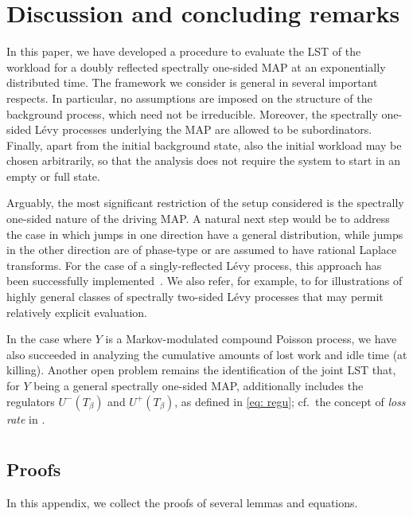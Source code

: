 \documentclass[reqno,12pt]{amsart}
\begin{document}
{\section{Discussion and concluding remarks}
In this paper, we have developed a procedure to evaluate the LST of the workload for a doubly reflected spectrally one-sided MAP at an exponentially distributed time. The framework we consider is general in several important respects. In particular, no assumptions are imposed on the structure of the background process, which need not be irreducible. Moreover, the spectrally one-sided L\'evy processes underlying the MAP are allowed to be subordinators. Finally, apart from the initial background state, also the initial workload may be chosen arbitrarily, so that the analysis does not require the system to start in an empty or full state.

Arguably, the most significant restriction of the setup considered is the spectrally one-sided nature of the driving MAP. A natural next step would be to address the case in which jumps in one direction have a general distribution, while jumps in the other direction are of phase-type or are assumed to have rational Laplace transforms. For the case of a singly-reflected L\'evy process, this approach has been successfully implemented~\cite{LM}. We also refer, for example, to \cite{ASG,PAR} for illustrations of highly general classes of spectrally two-sided L\'evy processes that may permit relatively explicit evaluation.

In the case where $Y$ is a Markov-modulated compound Poisson process, we have also succeeded in analyzing the cumulative amounts of lost work and idle time (at killing). Another open problem remains the identification of the joint LST that, for $Y$ being a general spectrally one-sided MAP, additionally includes the regulators $U^-(T_\beta)$ and $U^+(T_\beta)$, as defined in \eqref{eq: regu}; cf.\ the concept of {\it loss rate} in \cite{AAGP}. 



\appendix

\section{}
\subsection{Proofs}\label{app: proofs lemmas} In this appendix, we collect the proofs of several lemmas and equations.

}
\end{document}

